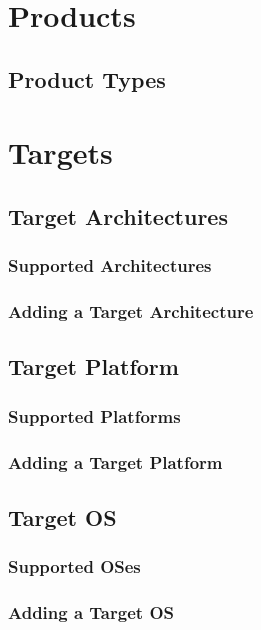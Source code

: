\documentclass[a4paper]{book}
\begin{document}
\chapter{Products}

\section{Product Types}


\chapter{Targets}

\section{Target Architectures}
\subsection{Supported Architectures}
\subsection{Adding a Target Architecture}

\section{Target Platform}
\subsection{Supported Platforms}
\subsection{Adding a Target Platform}

\section{Target OS}
\subsection{Supported OSes}
\subsection{Adding a Target OS}
\end{document}
